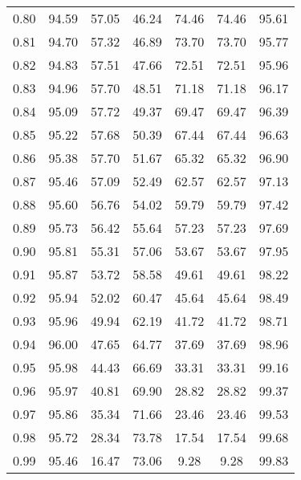 \begin{tabular}{|c|c|c|c|c|c|c|}
      0.80 &     94.59 &     57.05 &      46.24 &   74.46 &      74.46 &         95.61 \\
      0.81 &     94.70 &     57.32 &      46.89 &   73.70 &      73.70 &         95.77 \\
      0.82 &     94.83 &     57.51 &      47.66 &   72.51 &      72.51 &         95.96 \\
      0.83 &     94.96 &     57.70 &      48.51 &   71.18 &      71.18 &         96.17 \\
      0.84 &     95.09 &     57.72 &      49.37 &   69.47 &      69.47 &         96.39 \\
      0.85 &     95.22 &     57.68 &      50.39 &   67.44 &      67.44 &         96.63 \\
      0.86 &     95.38 &     57.70 &      51.67 &   65.32 &      65.32 &         96.90 \\
      0.87 &     95.46 &     57.09 &      52.49 &   62.57 &      62.57 &         97.13 \\
      0.88 &     95.60 &     56.76 &      54.02 &   59.79 &      59.79 &         97.42 \\
      0.89 &     95.73 &     56.42 &      55.64 &   57.23 &      57.23 &         97.69 \\
      0.90 &     95.81 &     55.31 &      57.06 &   53.67 &      53.67 &         97.95 \\
      0.91 &     95.87 &     53.72 &      58.58 &   49.61 &      49.61 &         98.22 \\
      0.92 &     95.94 &     52.02 &      60.47 &   45.64 &      45.64 &         98.49 \\
      0.93 &     95.96 &     49.94 &      62.19 &   41.72 &      41.72 &         98.71 \\
      0.94 &     96.00 &     47.65 &      64.77 &   37.69 &      37.69 &         98.96 \\
      0.95 &     95.98 &     44.43 &      66.69 &   33.31 &      33.31 &         99.16 \\
      0.96 &     95.97 &     40.81 &      69.90 &   28.82 &      28.82 &         99.37 \\
      0.97 &     95.86 &     35.34 &      71.66 &   23.46 &      23.46 &         99.53 \\
      0.98 &     95.72 &     28.34 &      73.78 &   17.54 &      17.54 &         99.68 \\
      0.99 &     95.46 &     16.47 &      73.06 &    9.28 &       9.28 &         99.83 \\
\bottomrule
\end{tabular}
